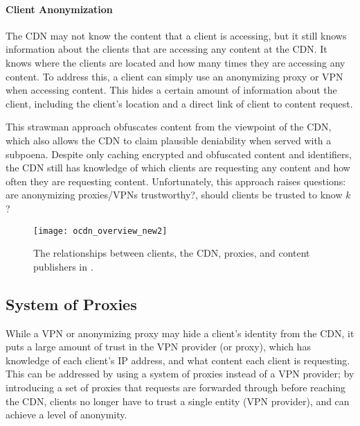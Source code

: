 \paragraph{Client Anonymization}  The CDN may not know the content that a client is accessing, but it 
still knows information about the clients that are accessing any content at the CDN.  It knows 
where the clients are located and how many times they are accessing any content.  To address this, 
a client can simply use an anonymizing proxy or VPN when accessing content.  This hides a certain 
amount of information about the client, including the client's location and a direct link of 
client to content request.

This strawman approach obfuscates content from the viewpoint of the CDN, which also allows the CDN 
to claim plausible deniability when served with a subpoena.  Despite only caching encrypted and obfuscated 
content and identifiers, the CDN still has knowledge of which clients are requesting any content and how often 
they are requesting content.  Unfortunately, this approach raises 
 questions: are anonymizing proxies/VPNs trustworthy?, should clients be trusted to know $k$?

\begin{figure}[t!]
\centering
\texttt{[image: ocdn\_overview\_new2]}
\caption{The relationships between clients, the CDN, proxies, and content publishers in 
\system{}.}
\label{fig:ocd_overview}
\end{figure}

\subsection{System of Proxies}
\label{sec:proxies}

While a VPN or anonymizing proxy may hide a client's identity from the CDN, it puts a large amount of trust in the VPN provider (or proxy), which 
has knowledge of each client's IP address, and what content each client is requesting.  This can be addressed 
by using a system of proxies instead of a VPN provider; by introducing a set of proxies that requests are 
forwarded through before reaching the CDN, clients no longer have to trust a single entity (VPN provider), and 
can achieve a level of anonymity.

